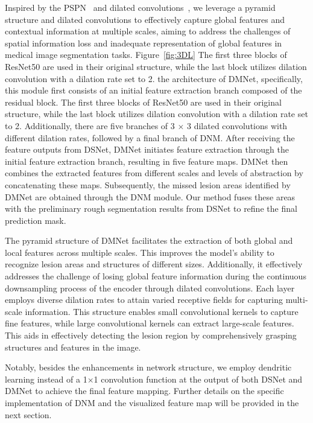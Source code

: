 \documentclass[review]{elsarticle}
\begin{document}
	Inspired by the PSPN~\cite{zhao2017pyramid} and dilated convolutions~\cite{chen2017deeplab}, we leverage a pyramid structure and dilated convolutions to effectively capture global features and contextual information at multiple scales, aiming to address the challenges of spatial information loss and inadequate representation of global features in medical image segmentation tasks. Figure~\ref{fig:3DL} The first three blocks of ResNet50 are used in their original structure, while the last block utilizes dilation convolution with a dilation rate set to 2. the architecture of DMNet, specifically, this module first consists of an initial feature extraction branch composed of the residual block. The first three blocks of ResNet50 are used in their original structure, while the last block utilizes dilation convolution with a dilation rate set to 2. Additionally, there are five branches of 3 $ \times $ 3 dilated convolutions with different dilation rates, followed by a final branch of DNM. After receiving the feature outputs from DSNet, DMNet initiates feature extraction through the initial feature extraction branch, resulting in five feature maps. DMNet then combines the extracted features from different scales and levels of abstraction by concatenating these maps. Subsequently, the missed lesion areas identified by DMNet are obtained through the DNM module. Our method fuses these areas with the preliminary rough segmentation results from DSNet to refine the final prediction mask.
	
	The pyramid structure of DMNet facilitates the extraction of both global and local features across multiple scales. This improves the model's ability to recognize lesion areas and structures of different sizes. Additionally, it effectively addresses the challenge of losing global feature information during the continuous downsampling process of the encoder through dilated convolutions. Each layer employs diverse dilation rates to attain varied receptive fields for capturing multi-scale information. This structure enables small convolutional kernels to capture fine features, while large convolutional kernels can extract large-scale features. This aids in effectively detecting the lesion region by comprehensively grasping structures and features in the image. 
	
	Notably, besides the enhancements in network structure, we employ dendritic learning instead of a 1$ \times $1 convolution function at the output of both DSNet and DMNet to achieve the final feature mapping. Further details on the specific implementation of DNM and the visualized feature map will be provided in the next section.
\end{document}
